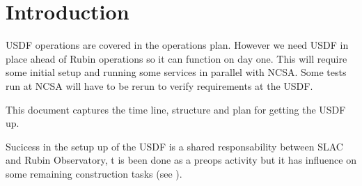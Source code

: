 \section{Introduction}
USDF operations are covered in the operations plan.
However we need USDF in place ahead of Rubin  operations so it can function on day one.
This will require some initial setup and running some services in parallel with NCSA.
Some tests  run at NCSA will have to be rerun to verify requirements at the USDF.

This document captures the time line, structure and plan for getting the USDF up.

Sucicess in the setup up of the USDF is a shared responsability between SLAC and Rubin Observatory,
t is been done as a preops activity but it has influence on some remaining construction tasks (see ).

